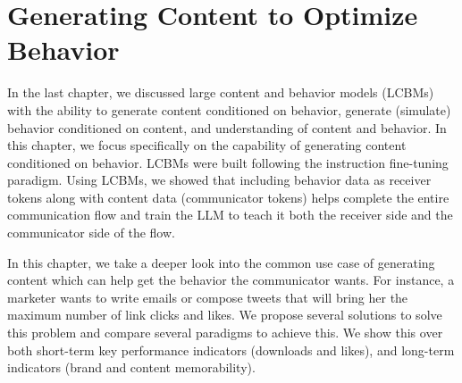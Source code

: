 \chapter{Generating Content to Optimize Behavior}
\label{chatper:Generating Content Leading to Optimal Behavior}


In the last chapter, we discussed large content and behavior models (LCBMs) with the ability to generate content conditioned on behavior, generate (simulate) behavior conditioned on content, and understanding of content and behavior. In this chapter, we focus specifically on the capability of generating content conditioned on behavior. LCBMs were built following the instruction fine-tuning paradigm. Using LCBMs, we showed that including behavior data as receiver tokens along with content data (communicator tokens) helps complete the entire communication flow and train the LLM to teach it both the receiver side and the communicator side of the flow. 


In this chapter, we take a deeper look into the common use case of generating content which can help get the behavior the communicator wants. For instance, a marketer wants to write emails or compose tweets that will bring her the maximum number of link clicks and likes. We propose several solutions to solve this problem and compare several paradigms to achieve this. We show this over both short-term key performance indicators (downloads and likes), and long-term indicators (brand and content memorability). 



\section{}


